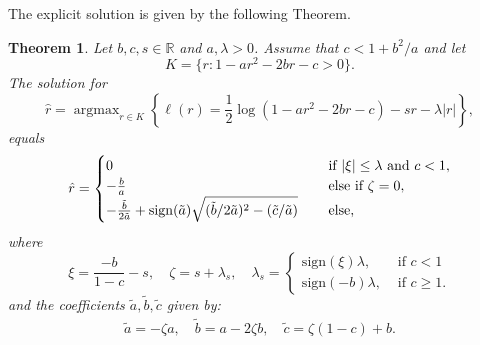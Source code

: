 \documentclass[12pt]{amsart}
\numberwithin{equation}{section}
\numberwithin{equation}{section}
\theoremstyle{plain}
\newtheorem{thm}{Theorem}
\theoremstyle{definition}
\DeclareMathOperator*{\argmax}{\arg\max}
\newcommand{\sign}{\mathrm{sign}}
\begin{document}
The explicit solution is given by the following Theorem.
\begin{thm}
\label{thm:element_update}
Let $b,c,s\in\mathbb{R}$ and $a,\lambda>0$. Assume that $c<1+b^2/a$ and let 
\[
K = \{r\colon 1-a r^2-2br-c>0\}.
\] The solution for 
\begin{equation}
\label{eq:rj2}
\hat{r}= \argmax_{r\in K} \left\{ \ell(r) = \frac{1}{2}\log\left(1 - a r^2 - 2b r - c \right) - s r - \lambda |r| \right\},
\end{equation}
equals
\begin{equation}
\label{explicit solution}
   \hat{r}=\begin{cases}
        0 & \hspace{0.3cm} \text{ if } \vert\xi\vert\leq \lambda \mbox{ and }c<1,\\
        -\frac{b}{a}&\hspace{0.3cm}\text{ else if } \zeta=0,
        \\
          -\frac{\tilde{b}}{2\tilde{a}} +\sign(\tilde{a}) \sqrt{(\tilde{b}/2\tilde{a})^2 - (\tilde{c}/\tilde{a})} & \hspace{0.3cm} \text{ else} ,
    \end{cases}
\end{equation}
where 
\begin{equation*}
    \xi = \frac{-b}{1-c} - s, \quad \zeta=s+\lambda_s,\quad\lambda_s = 
    \begin{cases}
        \sign(\xi)\lambda, & \text{ if } c<1\\
        \sign(-b)\lambda, & \text{ if } c\geq1.
    \end{cases} 
\end{equation*}
and the coefficients $\tilde{a},\tilde{b},\tilde{c}$ given by:
\begin{align*}
    \tilde{a} = -\zeta a,\quad \tilde{b} = a - 2\zeta b, \quad    \tilde{c} = \zeta(1-c) + b.
\end{align*}
\end{thm}
\end{document}
